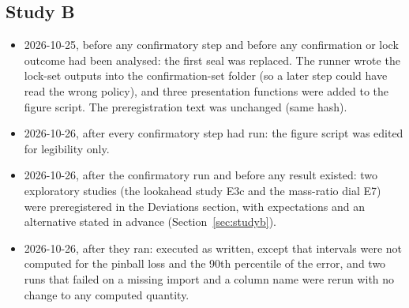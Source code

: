 \documentclass[10pt,letterpaper]{article}
\begin{document}
\subsection{Study B}
\begin{itemize}
\item 2026-10-25, before any confirmatory step and before any confirmation or lock outcome had been analysed: the first seal was replaced. The
runner wrote the lock-set outputs into the confirmation-set folder (so a later step could have read the wrong policy), and three presentation
functions were added to the figure script. The preregistration text was unchanged (same hash).
\item 2026-10-26, after every confirmatory step had run: the figure script was edited for legibility only.
\item 2026-10-26, after the confirmatory run and before any result existed: two exploratory studies (the lookahead study E3c and the mass-ratio
dial E7) were preregistered in the Deviations section, with expectations and an alternative stated in advance (Section~\ref{sec:studyb}).
\item 2026-10-26, after they ran: executed as written, except that intervals were not computed for the pinball loss and the 90th percentile of the
error, and two runs that failed on a missing import and a column name were rerun with no change to any computed quantity.
\end{itemize}
\end{document}
